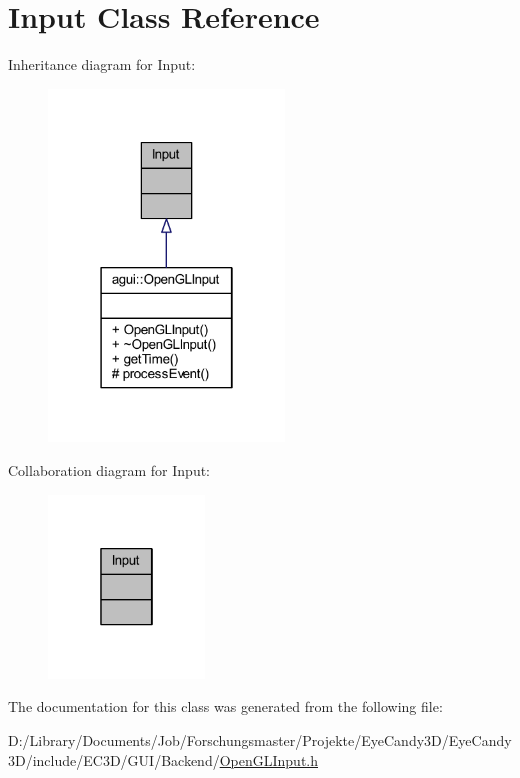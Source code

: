 \hypertarget{class_input}{}\section{Input Class Reference}
\label{class_input}


Inheritance diagram for Input\+:\nopagebreak
\begin{figure}[H]
\begin{center}
\leavevmode
\includegraphics[width=178pt]{class_input__inherit__graph}
\end{center}
\end{figure}


Collaboration diagram for Input\+:\nopagebreak
\begin{figure}[H]
\begin{center}
\leavevmode
\includegraphics[width=118pt]{class_input__coll__graph}
\end{center}
\end{figure}


The documentation for this class was generated from the following file\+:\begin{DoxyCompactItemize}
\item 
D\+:/\+Library/\+Documents/\+Job/\+Forschungsmaster/\+Projekte/\+Eye\+Candy3\+D/\+Eye\+Candy3\+D/include/\+E\+C3\+D/\+G\+U\+I/\+Backend/\mbox{\hyperlink{_open_g_l_input_8h}{Open\+G\+L\+Input.\+h}}\end{DoxyCompactItemize}
